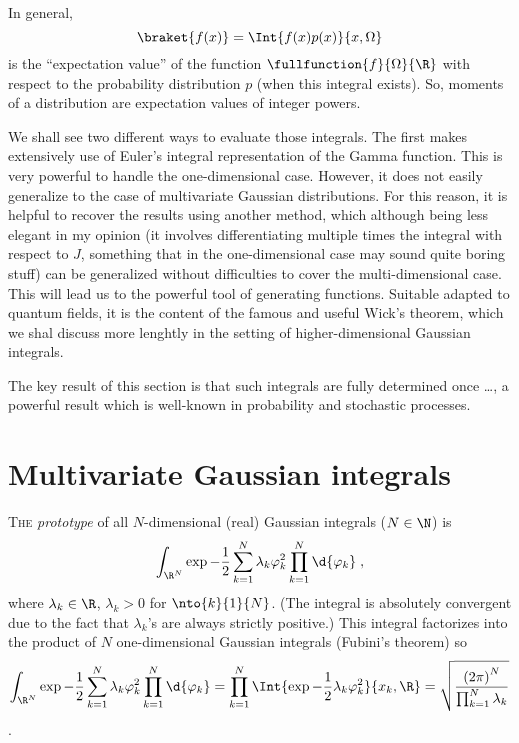 In general,  
\begin{dmath*}
   \braket{f(x)} = \Int{f(x) p(x)}{x, \Omega}
\end{dmath*}
is the ``expectation value'' of the function $\fullfunction{f}{\Omega}{\R}$ with respect to the probability
distribution $p$ (when this integral exists).
So, moments of a distribution are expectation values of integer powers.


We shall see two different ways to evaluate those integrals.  The first makes
extensively use of Euler's integral representation of the Gamma function.  This
is very powerful to handle the one-dimensional case.  However, it does not
easily generalize to the case of multivariate Gaussian distributions.  For this
reason, it is helpful to recover the results using another method, which
although being less elegant in my opinion (it involves differentiating multiple times the
integral with respect to $J$, something that in the one-dimensional case may
sound quite boring stuff) can be generalized without difficulties to cover
the multi-dimensional case. This will lead us to the powerful tool of
generating functions. Suitable adapted to quantum fields, it is the content of
the famous and useful Wick's theorem, which we shal  discuss more lenghtly in
the setting of higher-dimensional Gaussian integrals.

The key result of this section is that such integrals are fully determined once
\ldots, a powerful result which is well-known in probability and stochastic
processes.


\section{Multivariate Gaussian integrals}

\lettrine{T}{he} \emph{prototype}  of all $N$-dimensional (real) Gaussian integrals
($N\in\N$) is 
\begin{equation}
   \int_{\R^{N}} \exp{ - \frac{1}{2} \sum_{k=1}^{N} \lambda_{k} \varphi_{k}^{2} }
   \prod_{k=1}^{N} \d{\varphi_{k}} \; ,
\end{equation}
where $\lambda_{k} \in \R$, $\lambda_{k} >0$ for $\nto{k}{1}{N}$.
(The integral is absolutely convergent due to the fact that $\lambda_{k}$'s are
always
strictly positive.)
This integral factorizes into the product of $N$ one-dimensional Gaussian
integrals (Fubini's theorem) so
\begin{dmath}[compact]
   \int_{\R^{N}} \exp{ - \frac{1}{2} \sum_{k=1}^{N} \lambda_{k} \varphi_{k}^{2} }
   \prod_{k=1}^{N} \d{\varphi_{k}} = \prod_{k=1}^{N} \Int{\exp{-\frac{1}{2}
	 \lambda_{k} \varphi_{k}^{2}}}{x_{k}, \R} =   \sqrt{\frac{ \left(
	    2\pi\right)^{N}}{ \prod_{k=1}^{N} \lambda_{k}}} 
\end{dmath}.


